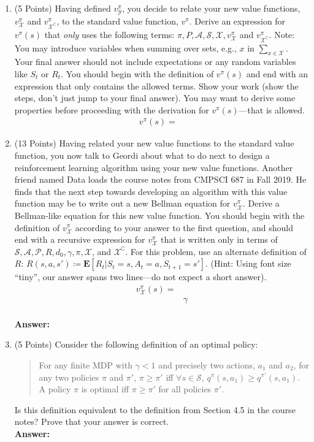 \documentclass[]{article}
\begin{document}
\begin{enumerate}
    \item (5 Points) Having defined $v^\pi_\mathcal Y$, you decide to relate your new value functions, $v^\pi_\mathcal X$ and $v^\pi_{\mathcal X^\complement}$, to the standard value function, $v^\pi$. Derive an expression for $v^\pi(s)$ that \emph{only} uses the following terms: $\pi, P, \mathcal A, \mathcal S, \mathcal X, v^\pi_\mathcal X$ and $v^\pi_{\mathcal X^\complement}$. Note: You may introduce variables when summing over sets, e.g., $x$ in  $\sum_{x \in \mathcal X}$. Your final answer should not include expectations or any random variables like $S_t$ or $R_t$. You should begin with the definition of $v^\pi(s)$ and end with an expression that only contains the allowed terms. Show your work (show the steps, don't just jump to your final answer). You may want to derive some properties before proceeding with the derivation for $v^\pi(s)$---that is allowed.
    \begin{align}
        v^\pi(s)=&
    \end{align}
    \item (13 Points) Having related your new value functions to the standard value function, you now talk to Geordi about what to do next to design a reinforcement learning algorithm using your new value functions. Another friend named Data loads the course notes from CMPSCI 687 in Fall 2019. He finds that the next step towards developing an algorithm with this value function may be to write out a new Bellman equation for $v^\pi_\mathcal X$. Derive a Bellman-like equation for this new value function. You should begin with the definition of $v^\pi_\mathcal X$ according to your answer to the first question, and should end with a recursive expression for $v^\pi_\mathcal X$ that is written only in terms of $\mathcal S, \mathcal A, \mathcal P,  R, d_0, \gamma, \pi, \mathcal X$, and $\mathcal X^\complement$. For this problem, use an alternate definition of $R$: $R(s,a,s')\coloneqq\mathbf{E}[R_t|S_t=s,A_t=a,S_{t+1}=s']$. (Hint: Using font size ``tiny'', our answer spans two lines---do not expect a short answer).
    \begin{align}
        v^\pi_{\mathcal X}(s)=&\\
        &\gamma
    \end{align}
    \\
    \textbf{Answer:}\\



    \item (5 Points) Consider the following definition of an optimal policy:
    \begin{quote}
        For any finite MDP with $\gamma<1$ and precisely two actions, $a_1$ and $a_2$, for any two policies $\pi$ and $\pi'$, $\pi \geq \pi'$ iff $\forall s \in \mathcal S$, $q^\pi(s,a_1) \geq q^{\pi'}(s,a_1)$. A policy $\pi$ is optimal iff $\pi \geq \pi'$ for all policies $\pi'$. 
    \end{quote}
    Is this definition equivalent to the definition from Section 4.5 in the course notes? Prove that your answer is correct.
    \\
    \textbf{Answer:}\\


\end{enumerate}
\end{document}
